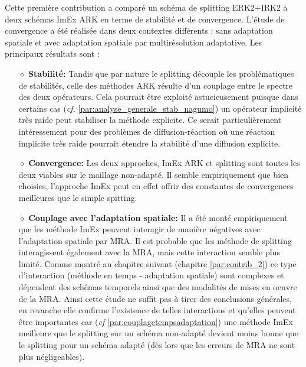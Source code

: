 Cette première contribution a comparé un schéma de splitting ERK2+IRK2 à deux schémas ImEx ARK en terme de stabilité et de convergence. 
L'étude de convergence a été réalisée dans deux contextes différents : sans adaptation spatiale et avec adaptation spatiale par multirésolution adaptative.
Les principaux résultats sont : 
\begin{itemize}
    \item[$\diamond$] \textbf{Stabilité:} Tandis que par nature le splitting 
    découple les problématiques de stabilités, celle des méthodes ARK résulte d'un couplage entre le spectre des deux opérateurs.  
    Cela pourrait être exploité astucieusement puisque dans certains cas (\textit{cf.} \ref{par:analyse_generale_stab_nagumo})
    un opérateur implicité très raide peut stabiliser la méthode explicite. Ce serait particulièrement intéressement pour des problèmes de diffusion-réaction
    où une réaction implicite très raide pourrait étendre la stabilité d'une diffusion explicite.
    \item[$\diamond$] \textbf{Convergence:} Les deux approches, ImEx ARK et splitting sont toutes les deux viables sur le maillage non-adapté.
    Il semble empiriquement que bien choisies, l'approche ImEx peut en effet offrir des constantes de convergences meilleures que le simple spitting.
    \item[$\diamond$] \textbf{Couplage avec l'adaptation spatiale:} Il a été monté empiriquement
    que les méthode ImEx peuvent interagir de manière négatives avec l'adaptation spatiale par MRA.
    Il est probable que les méthode de splitting interagissent également avec la MRA, mais cette interaction semble plus limité.
    Comme montré au chapitre suivant (chapitre \ref{par:contrib_2}) ce type d'interaction (méthode en temps - adaptation spatiale)
    sont complexes et dépendent des schémas temporels ainsi que des modalités de mises en oeuvre de la MRA.
    Ainsi cette étude ne suffit pas à tirer des conclusions générales,
    en revanche elle confirme l'existence de telles interactions et qu'elles peuvent être importantes car (\textit{cf} \ref{par:couplagetempsadaptation}) une méthode ImEx meilleure que le splitting sur un schéma non-adapté 
    devient moins bonne que le splitting pour un schéma adapté (dès lors que les erreurs de MRA ne sont plus négligeables).
\end{itemize}